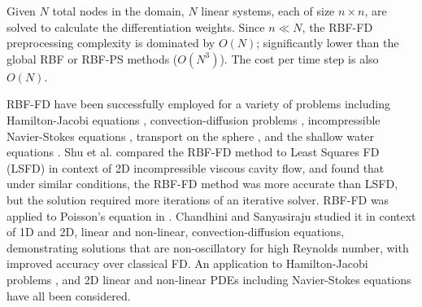 \documentclass[11pt]{report}
\begin{document}
{Given $N$ total nodes in the domain, $N$ linear systems, each of size $n \times n$, are solved to calculate the differentiation weights. Since $n \ll N$, the RBF-FD preprocessing complexity is dominated by $O(N)$; significantly lower than the global RBF or RBF-PS methods ($O(N^3)$). The cost per time step is also $O(N)$. 

RBF-FD have been successfully employed for a variety of problems including Hamilton-Jacobi equations \cite{Cecil2004}, convection-diffusion problems \cite{Chandhini2007, Stevens2009b},
incompressible Navier-Stokes equations \cite{Shu2003,Chinchapatnam2009}, transport on the sphere \cite{FornbergLehto11}, and the shallow water equations \cite{FlyerLehto11}.
Shu et al. \cite{Shu2006} compared the RBF-FD method to Least Squares FD (LSFD) in context of 2D incompressible viscous 
cavity flow, and found that under similar conditions, the RBF-FD method was more accurate than LSFD, but the solution required 
more iterations of an iterative solver. RBF-FD was applied to Poisson's 
equation in \cite{Wright2004}.  Chandhini and Sanyasiraju \cite{Chandhini2007} studied it in context of 1D and 2D, 
linear and non-linear, 
convection-diffusion equations, demonstrating solutions that are non-oscillatory for high Reynolds number, with improved 
accuracy over classical FD. An application to Hamilton-Jacobi problems \cite{Cecil2004}, and 2D linear and non-linear PDEs 
including Navier-Stokes equations \cite{Shu2003} have all been considered. 





}
\end{document}
